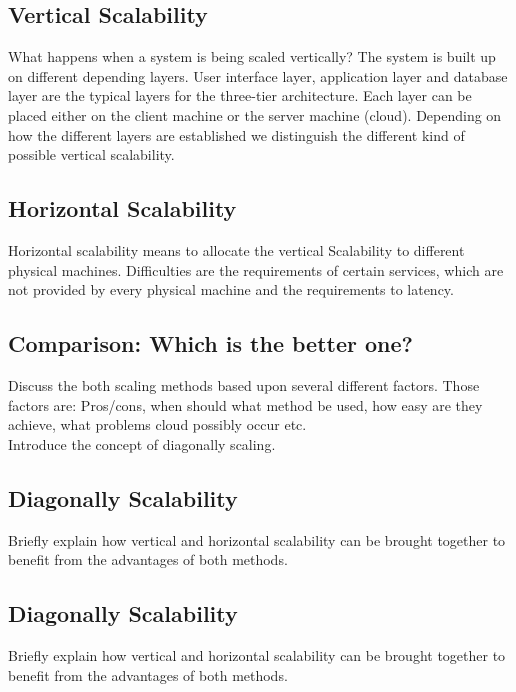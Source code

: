 \documentclass[sigconf]{acmart}
\begin{document}
\subsection{Vertical Scalability}

What happens when a system is being scaled vertically? The
system is built up on different depending layers. User interface
layer, application layer and database layer are the typical layers
for the three-tier architecture. Each layer can be placed either
on the client machine or the server machine (cloud). Depending
on how the different layers are established we distinguish the
different kind of possible vertical scalability.

\subsection{Horizontal Scalability}

Horizontal scalability means to allocate the vertical
Scalability to different physical machines. Difficulties are the
requirements of certain services, which are not provided by
every physical machine and the requirements to latency.

\subsection{Comparison: Which is the better one?}

Discuss the both scaling methods based upon several
different factors. Those factors are: Pros/cons, when should
what method be used, how easy are they achieve, what
problems cloud possibly occur etc. \\

Introduce the concept of diagonally scaling.

\subsection{Diagonally Scalability}

Briefly explain how vertical and horizontal scalability can
be brought together to benefit from the advantages of both
methods.

\subsection{Diagonally Scalability}

Briefly explain how vertical and horizontal scalability can
be brought together to benefit from the advantages of both
methods.
\end{document}
